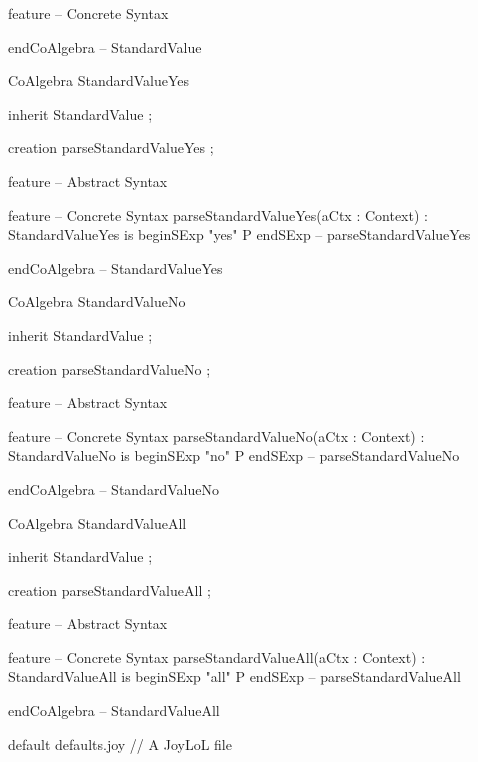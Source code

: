 feature -- Concrete Syntax

endCoAlgebra -- StandardValue

CoAlgebra StandardValueYes

inherit
  StandardValue ; 

creation
  parseStandardValueYes ;
  
feature -- Abstract Syntax

feature -- Concrete Syntax
  parseStandardValueYes(aCtx : Context) : StandardValueYes is
    beginSExp
      "yes" P
    endSExp -- parseStandardValueYes
  
endCoAlgebra -- StandardValueYes

CoAlgebra StandardValueNo

inherit
  StandardValue ; 

creation
  parseStandardValueNo ;
  
feature -- Abstract Syntax

feature -- Concrete Syntax
  parseStandardValueNo(aCtx : Context) : StandardValueNo is
    beginSExp
      "no" P
    endSExp -- parseStandardValueNo
  
endCoAlgebra -- StandardValueNo

CoAlgebra StandardValueAll

inherit
  StandardValue ; 

creation
  parseStandardValueAll ;
  
feature -- Abstract Syntax

feature -- Concrete Syntax
  parseStandardValueAll(aCtx : Context) : StandardValueAll is
    beginSExp
      "all" P
    endSExp -- parseStandardValueAll
  
endCoAlgebra -- StandardValueAll

\stopJoylolCode
{}
\createJoylolCodeFile%
  {default}
  {defaults.joy}
  {// A JoyLoL file}
